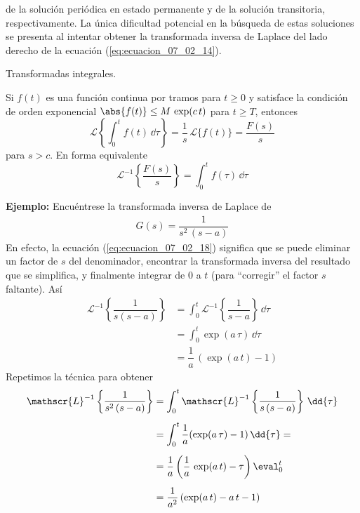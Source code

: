 de la solución periódica en estado permanente y de la solución transitoria, respectivamente. La única dificultad potencial en la búsqueda de estas soluciones se presenta al intentar obtener la transformada inversa de Laplace del lado derecho de la ecuación (\ref{eq:ecuacion_07_02_14}). 
\begin{teo}{Transformadas integrales.}

Si $f(t)$ es una función continua por tramos para $t \geq 0$ y satisface la condición de orden exponencial $\abs{f(t)} \leq M \, \exp(c \, t)$ para $t \geq T $, entonces
\begin{equation}
\mathscr{L} \left\{ \int_{0}^{t} f(t) \, \dd{\tau} \right\} = \dfrac{1}{s} \, \mathscr{L} \{ f(t) \} = \dfrac{F(s)}{s}
\label{eq:ecuacion_07_02_17}
\end{equation}
para $s > c$. En forma equivalente 
\begin{equation}
\mathscr{L}^{-1} \left\{ \dfrac{F(s)}{s} \right\} = \int_{0}^{t} f(\tau) \, \dd{\tau}
\label{eq:ecuacion_07_02_18}
\end{equation} 
\end{teo}
\textbf{Ejemplo: } Encuéntrese la transformada inversa de Laplace de
\begin{align*}
G(s) = \dfrac{1}{s^{2} \, (s - a)}
\end{align*}
En efecto, la ecuación (\ref{eq:ecuacion_07_02_18}) significa que se puede eliminar un factor de $s$ del denominador, encontrar la transformada inversa del resultado que se simplifica, y finalmente integrar de $0$ a $t$ (para \enquote{corregir} el factor $s$ faltante). Así
\begin{align*}
\mathscr{L}^{-1} \left\{  \dfrac{1}{s (s - a)} \right\} &= \int_{0}^{t} \mathscr{L}^{-1} \left\{ \dfrac{1}{s - a} \right\}  \, \dd{\tau} \\
&= \int_{0}^{t} \exp(a \, \tau) \, \dd{\tau} \\
&= \dfrac{1}{a} \, (\exp(a \, t) - 1)
\end{align*}
Repetimos la técnica para obtener
\begin{align*}
\mathscr{L}^{-1} \left\{  \dfrac{1}{s^{2} \, (s - a)} \right\} &= \int_{0}^{t} \mathscr{L}^{-1} \left\{ \dfrac{1}{s \, (s - a)} \right\} \, \dd{\tau}  \\[0.5em]
&= \int_{0}^{t} \dfrac{1}{a} (\exp(a \, \tau) - 1) \, \dd{\tau}  = \\[0.5em]
&= \dfrac{1}{a} \left( \dfrac{1}{a} \, \exp(a \, t) - \tau \right) \eval_{0}^{t} \\[0.5em]
&= \dfrac{1}{a^{2}} \, (\exp(a \, t) - a \, t - 1)
\end{align*}
